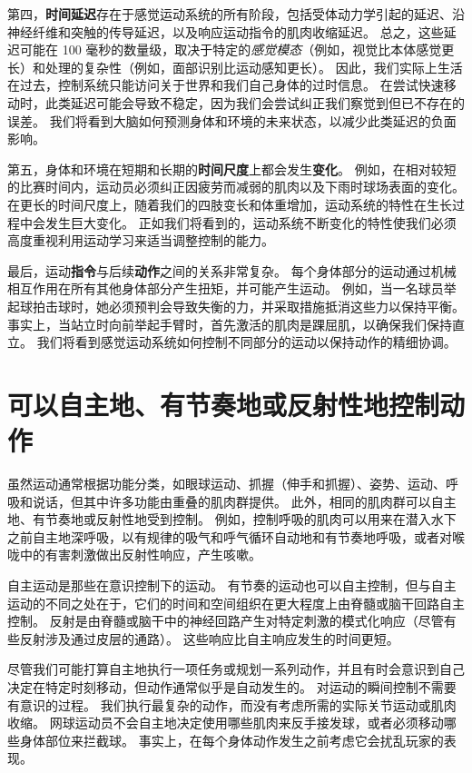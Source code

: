 第四，\textbf{时间延迟}存在于感觉运动系统的所有阶段，包括受体动力学引起的延迟、沿神经纤维和突触的传导延迟，以及响应运动指令的肌肉收缩延迟。
总之，这些延迟可能在 100 毫秒的数量级，取决于特定的\textit{感觉模态}（例如，视觉比本体感觉更长）和处理的复杂性（例如，面部识别比运动感知更长）。
因此，我们实际上生活在过去，控制系统只能访问关于世界和我们自己身体的过时信息。
在尝试快速移动时，此类延迟可能会导致不稳定，因为我们会尝试纠正我们察觉到但已不存在的误差。
我们将看到大脑如何预测身体和环境的未来状态，以减少此类延迟的负面影响。


第五，身体和环境在短期和长期的\textbf{时间尺度}上都会发生\textbf{变化}。
例如，在相对较短的比赛时间内，运动员必须纠正因疲劳而减弱的肌肉以及下雨时球场表面的变化。
在更长的时间尺度上，随着我们的四肢变长和体重增加，运动系统的特性在生长过程中会发生巨大变化。
正如我们将看到的，运动系统不断变化的特性使我们必须高度重视利用运动学习来适当调整控制的能力。


最后，运动\textbf{指令}与后续\textbf{动作}之间的关系非常复杂。
每个身体部分的运动通过机械相互作用在所有其他身体部分产生扭矩，并可能产生运动。
例如，当一名球员举起球拍击球时，她必须预判会导致失衡的力，并采取措施抵消这些力以保持平衡。
事实上，当站立时向前举起手臂时，首先激活的肌肉是踝屈肌，以确保我们保持直立。
我们将看到感觉运动系统如何控制不同部分的运动以保持动作的精细协调。



\section{可以自主地、有节奏地或反射性地控制动作}

虽然运动通常根据功能分类，如眼球运动、抓握（伸手和抓握）、姿势、运动、呼吸和说话，但其中许多功能由重叠的肌肉群提供。
此外，相同的肌肉群可以自主地、有节奏地或反射性地受到控制。
例如，控制呼吸的肌肉可以用来在潜入水下之前自主地深呼吸，以有规律的吸气和呼气循环自动地和有节奏地呼吸，或者对喉咙中的有害刺激做出反射性响应，产生咳嗽。


自主运动是那些在意识控制下的运动。
有节奏的运动也可以自主控制，但与自主运动的不同之处在于，它们的时间和空间组织在更大程度上由脊髓或脑干回路自主控制。
反射是由脊髓或脑干中的神经回路产生对特定刺激的模式化响应（尽管有些反射涉及通过皮层的通路）。
这些响应比自主响应发生的时间更短。


尽管我们可能打算自主地执行一项任务或规划一系列动作，并且有时会意识到自己决定在特定时刻移动，但动作通常似乎是自动发生的。
对运动的瞬间控制不需要有意识的过程。
我们执行最复杂的动作，而没有考虑所需的实际关节运动或肌肉收缩。
网球运动员不会自主地决定使用哪些肌肉来反手接发球，或者必须移动哪些身体部位来拦截球。
事实上，在每个身体动作发生之前考虑它会扰乱玩家的表现。



